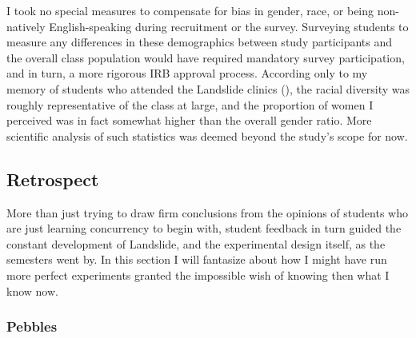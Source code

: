 I took no special measures to compensate for bias in gender, race, or being non-natively English-speaking
during recruitment or the survey.
Surveying students to measure any differences in these demographics between study participants and the overall class population
would have required mandatory survey participation,
and in turn, a more rigorous IRB approval process.
According only to my memory of students who attended the Landslide clinics
(\sect{\ref{sec:education-pebbles-recruiting}}),
the racial diversity was roughly representative of the class at large,
and the proportion of women I perceived was in fact somewhat higher than the overall gender ratio.
More scientific analysis of such statistics was deemed beyond the study's scope for now.

\subsection{Retrospect}

More than just trying to draw firm conclusions from
the opinions of students who are just learning concurrency to begin with,
student feedback in turn guided the constant development
of Landslide, and the experimental design itself,
as the semesters went by.
In this section I will fantasize about how I might have run more perfect experiments
granted the impossible wish of knowing then what I know now.

\subsubsection{Pebbles}

